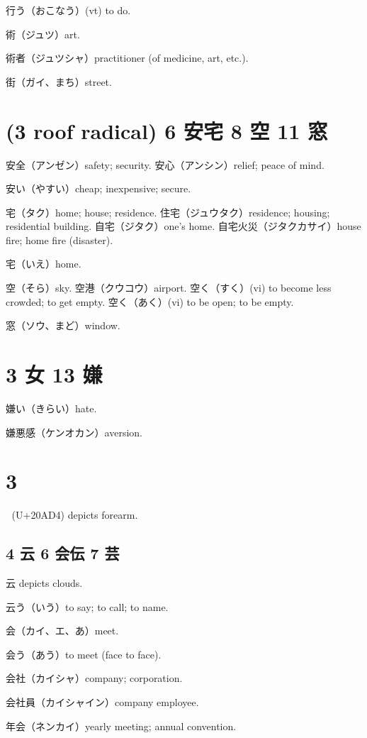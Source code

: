 行う（おこなう）(vt) to do.

術（ジュツ）art.

術者（ジュツシャ）practitioner (of medicine, art, etc.).

街（ガイ、まち）street.

\section{(3 roof radical) 6 安宅 8 空 11 窓}

安全（アンゼン）safety; security.
安心（アンシン）relief; peace of mind.

安い（やすい）cheap; inexpensive; secure.

宅（タク）home; house; residence.
住宅（ジュウタク）residence; housing; residential building.
自宅（ジタク）one's home.
自宅火災（ジタクカサイ）house fire; home fire (disaster).

宅（いえ）home.

空（そら）sky.
空港（クウコウ）airport.
空く（すく）(vi) to become less crowded; to get empty.
空く（あく）(vi) to be open; to be empty.

窓（ソウ、まど）window.

\section{3 女 13 嫌}

嫌い（きらい）hate.

嫌悪感（ケンオカン）aversion.

\section{3 𠫔}

𠫔 (U+20AD4) depicts forearm.

\subsection{4 云 6 会伝 7 芸}

云 depicts clouds.

云う（いう）to say; to call; to name.

会（カイ、エ、あ）meet.

会う（あう）to meet (face to face).

会社（カイシャ）company; corporation.

会社員（カイシャイン）company employee.

年会（ネンカイ）yearly meeting; annual convention.

